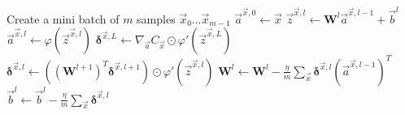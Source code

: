 \begin{algorithm}[p]
\caption{Stochastic Gradient Descent: Neural Network}
\label{alg:backpropnn}
\begin{algorithmic}
    \State Create a mini batch of $m$ samples $\vec{x}_0 \ldots \vec{x}_{m-1}$
        \State $\vec{a}^{\vec{x},0} \gets \vec{x}$  
          
            \State $\vec{z}^{\vec{x},l} \gets \mathbf{W}^l \vec{a}^{\vec{x},l-1}+\vec{b}^l$
            \State $\vec{a}^{\vec{x},l} \gets \varphi(\vec{z}^{\vec{x},l})$
        \EndFor
        \State $\bm{\delta}^{\vec{x},L} \gets \nabla_{\vec{a}} C_\vec{x} \odot \varphi'(\vec{z}^{\vec{x},L})$ 
          
            \State $\bm{\delta}^{\vec{x},l} \gets ((\mathbf{W}^{l+1})^T \bm{\delta}^{\vec{x},l+1})\odot \varphi'(\vec{z}^{\vec{x},l})$
        \EndFor
    \EndFor
     \Comment  {}
        \State $ \mathbf{W}^l \gets \mathbf{W}^l-\frac{\eta}{m} \sum_\vec{x} \bm{\delta}^{\vec{x},l} (\vec{a}^{\vec{x},l-1})^T$
        \State $\vec{b}^l \gets \vec{b}^l-\frac{\eta}{m}\sum_\vec{x} \bm{\delta}^{\vec{x},l}$  
    \EndFor
\end{algorithmic}
\end{algorithm}